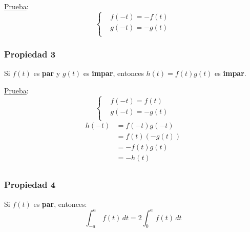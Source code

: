 \underline{Prueba}:
\begin{equation*}
\begin{cases}
    &f(-t)=-f(t)\\
    &g(-t)=-g(t)\\
\end{cases}
\end{equation*}

\subsubsection*{Propiedad 3}
Si $f(t)$ es \textbf{par} y $g(t)$ es \textbf{impar}, entonces $h(t)=f(t)g(t)$
es \textbf{impar}.

\underline{Prueba}:
\begin{equation*}
\begin{cases}
    &f(-t)=f(t)\\
    &g(-t)=-g(t)\\
\end{cases}
\end{equation*}
\begin{equation*}
\begin{split}
    h(-t)
        &=f(-t)g(-t)\\
        &=f(t)(-g(t))\\
        &=-f(t)g(t)\\
        &=-h(t)\\
\end{split}
\end{equation*}

\subsubsection*{Propiedad 4}
Si $f(t)$ es \textbf{par}, entonces:
\begin{equation}
    \int_{-a}^a\,f(t)\,dt=2\int_0^a\,f(t)\,dt
\end{equation}
\begin{figure}[H]
    \centering
    
\end{figure}

